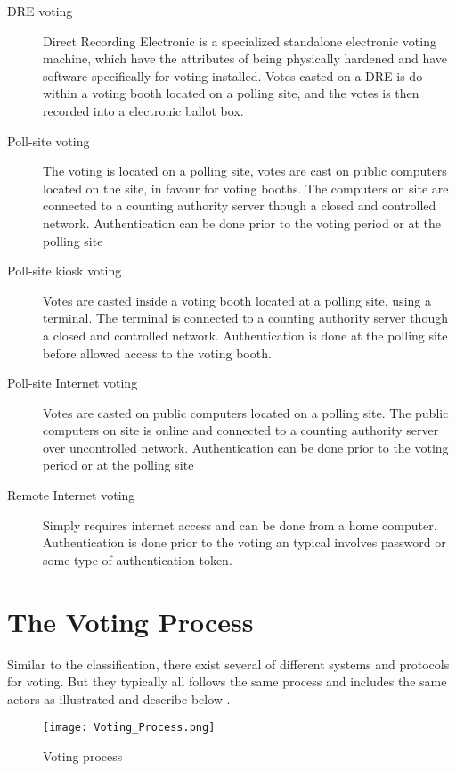 \begin{description}
\item[DRE voting] Direct Recording Electronic is a specialized standalone electronic voting machine, which have the attributes of being physically hardened and have software specifically for voting installed. Votes casted on a DRE is do within a voting booth located on a polling site, and the votes is then recorded into a electronic ballot box.

\item[Poll-site voting] The voting is located on a polling site, votes are cast on public computers located on the site, in favour for voting booths. The computers on site are connected to a counting authority server though a closed and controlled network. Authentication can be done prior to the voting period or at the polling site

\item[Poll-site kiosk voting] Votes are casted inside a voting booth located at a polling site, using a terminal. The terminal is connected to a counting authority server though a closed and controlled network. Authentication is done at the polling site before allowed access to the voting booth. 

\item[Poll-site Internet voting] Votes are casted on public computers located on a polling site. The public computers on site is online and connected to a counting authority server over uncontrolled network. Authentication can be done prior to the voting period or at the polling site

\item[Remote Internet voting] Simply requires internet access and can be done from a home computer. Authentication is done prior to the voting an typical involves password or some type of authentication token. 

\end{description}


\section{The Voting Process}
Similar to the classification, there exist several of different systems and protocols for voting. But they typically all follows the same process and includes the same actors as illustrated and describe below \cite{Cet09}. 

\begin{figure}[H]
\centering
\texttt{[image: Voting\_Process.png]}

\caption{Voting process}
\label{fig:Voting_Process}
\end{figure}

